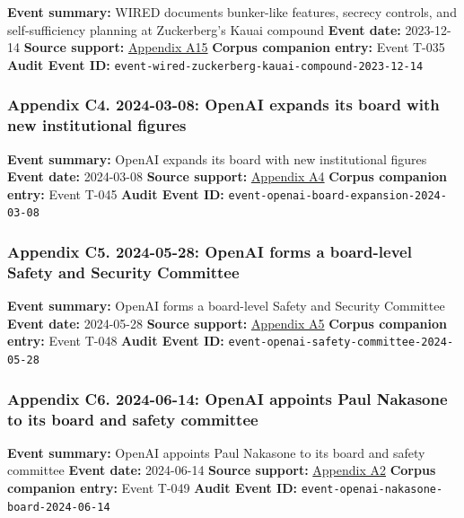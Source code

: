 \documentclass[
  american,
  11pt,
  letterpaper,
]{article}
\begin{document}
\textbf{Event summary:} WIRED documents bunker-like features, secrecy
controls, and self-sufficiency planning at Zuckerberg's Kauai compound
\textbf{Event date:} 2023-12-14 \textbf{Source support:}
\hyperref[appendix-a15-inside-mark-zuckerbergs-top-secret-hawaii-compound]{Appendix
A15} \textbf{Corpus companion entry:} Event T-035 \textbf{Audit Event
ID:} \texttt{event-wired-zuckerberg-kauai-compound-2023-12-14}

\subsubsection{Appendix C4. 2024-03-08: OpenAI expands its board with
new institutional
figures}\label{appendix-c4-2024-03-08-openai-expands-its-board-with-new-institutional-figures}

\textbf{Event summary:} OpenAI expands its board with new institutional
figures \textbf{Event date:} 2024-03-08 \textbf{Source support:}
\hyperref[appendix-a4-openai-announces-new-members-to-board-of-directors]{Appendix
A4} \textbf{Corpus companion entry:} Event T-045 \textbf{Audit Event
ID:} \texttt{event-openai-board-expansion-2024-03-08}

\subsubsection{Appendix C5. 2024-05-28: OpenAI forms a board-level
Safety and Security
Committee}\label{appendix-c5-2024-05-28-openai-forms-a-board-level-safety-and-security-committee}

\textbf{Event summary:} OpenAI forms a board-level Safety and Security
Committee \textbf{Event date:} 2024-05-28 \textbf{Source support:}
\hyperref[appendix-a5-openai-board-forms-safety-and-security-committee]{Appendix
A5} \textbf{Corpus companion entry:} Event T-048 \textbf{Audit Event
ID:} \texttt{event-openai-safety-committee-2024-05-28}

\subsubsection{Appendix C6. 2024-06-14: OpenAI appoints Paul Nakasone to
its board and safety
committee}\label{appendix-c6-2024-06-14-openai-appoints-paul-nakasone-to-its-board-and-safety-committee}

\textbf{Event summary:} OpenAI appoints Paul Nakasone to its board and
safety committee \textbf{Event date:} 2024-06-14 \textbf{Source
support:}
\hyperref[appendix-a2-openai-appoints-former-top-us-cyberwarrior-paul-nakasone-to-its-board-of-directors]{Appendix
A2} \textbf{Corpus companion entry:} Event T-049 \textbf{Audit Event
ID:} \texttt{event-openai-nakasone-board-2024-06-14}
\end{document}
